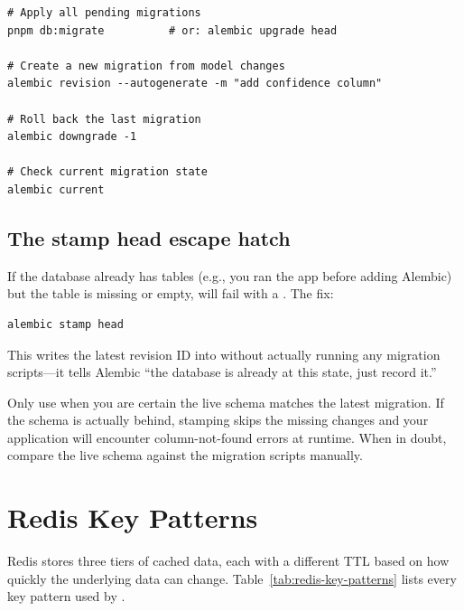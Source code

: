 \begin{lstlisting}[style=bash, numbers=none, caption={Alembic commands you will use most.}]
# Apply all pending migrations
pnpm db:migrate          # or: alembic upgrade head

# Create a new migration from model changes
alembic revision --autogenerate -m "add confidence column"

# Roll back the last migration
alembic downgrade -1

# Check current migration state
alembic current
\end{lstlisting}

\subsection*{The stamp head escape hatch}

If the database already has tables (e.g., you ran the app before adding Alembic)
but the  table is missing or empty, 
will fail with a .  The fix:

\begin{lstlisting}[style=bash, numbers=none]
alembic stamp head
\end{lstlisting}

This writes the latest revision ID into  without actually
running any migration scripts---it tells Alembic ``the database is already at
this state, just record it.''

\begin{warning}
Only use  when you are certain the live schema matches
the latest migration.  If the schema is actually behind, stamping skips the
missing changes and your application will encounter column-not-found errors at
runtime.  When in doubt, compare the live schema against the migration scripts
manually.
\end{warning}


\section{Redis Key Patterns}
\label{sec:redis-key-patterns}

Redis stores three tiers of cached data, each with a different TTL based on how
quickly the underlying data can change.
Table~\ref{tab:redis-key-patterns} lists every key pattern used by \sysname{}.

